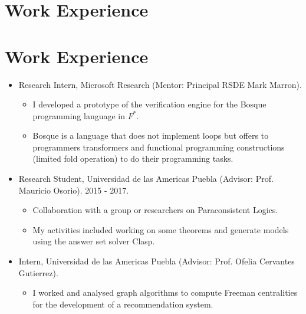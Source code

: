 \section{Work Experience}

\section{Work Experience}

\begin{itemize}

  \item Research Intern, Microsoft Research (Mentor: Principal RSDE Mark Marron).
    \begin{itemize}
      \item I developed a prototype of the verification engine for the Bosque programming language in $F^{*}$. 
      \item Bosque is a language that does not implement loops but offers to programmers transformers
        and functional programming constructions (limited fold operation) to do their programming tasks.
    \end{itemize}


  \item Research Student, Universidad de las Americas Puebla (Advisor: Prof. Mauricio
    Osorio). 2015 - 2017. 
    \begin{itemize}
      \item Collaboration with a group or researchers on Paraconsistent
        Logics. 
      \item My activities included working on some theorems and generate models using
        the answer set solver Clasp.
    \end{itemize}

  \item Intern, Universidad de las Americas Puebla (Advisor: Prof. Ofelia
    Cervantes Gutierrez). 
    \begin{itemize}
      \item I worked and analysed graph algorithms to
        compute Freeman centralities for the development of a recommendation
        system.
    \end{itemize}
\end{itemize}
